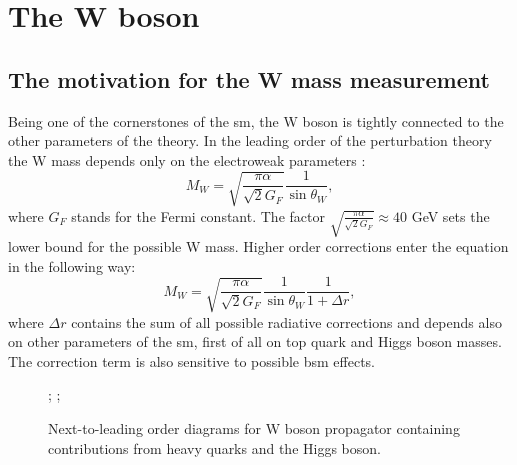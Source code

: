 \chapter{The W boson}
    
   
        
    	\section{The motivation for the W mass measurement}    
        Being one of the cornerstones of the \gls{sm}, the W boson is tightly connected to the other parameters of the theory. In the leading order of the perturbation theory the W mass depends only on the electroweak parameters \cite{Awramik}:
        \begin{equation}
        M_W=\sqrt{\frac{\pi \alpha}{\sqrt{2}G_F}}\frac{1}{\sin{\theta_W}},
        \end{equation}
        where $G_F$ stands for the Fermi constant. The factor $\sqrt{\frac{\pi \alpha}{\sqrt{2}G_F}} \approx 40$ GeV sets the lower bound for the possible W mass. Higher order corrections enter the equation in the following way:
        \begin{equation}
        M_W=\sqrt{\frac{\pi \alpha}{\sqrt{2}G_F}}\frac{1}{\sin{\theta_W}}\frac{1}{1+\Delta r},
        \end{equation}
        where $\Delta r $ contains the sum of all possible radiative corrections and depends also on other parameters of the \gls{sm}, first of all on top quark and Higgs boson masses. The correction term is also sensitive to possible \gls{bsm} effects.
        \begin{figure}
        	\label{fig::mw_cor}
        	\centering
        	;
        		\;  \; \; \; 
        	;
        	\caption{ Next-to-leading order diagrams for W boson propagator containing contributions from heavy quarks and the Higgs boson.}
        \end{figure}
